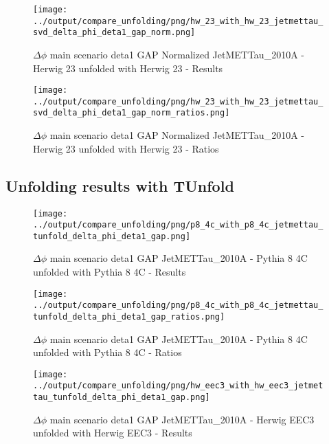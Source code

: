 \documentclass[11pt]{book}
\begin{document}
\begin{figure}[ht]
\centering
\texttt{[image: ../output/compare\_unfolding/png/hw\_23\_with\_hw\_23\_jetmettau\_svd\_delta\_phi\_deta1\_gap\_norm.png]}
\caption{$\Delta\phi$ main scenario deta1 GAP Normalized JetMETTau\_2010A - Herwig 23 unfolded with Herwig 23 - Results}
\label{hw_23_hw_23_jetmettau_svd_delta_phi_deta1_gap_norm_a}
\end{figure}

\begin{figure}[ht]
\centering
\texttt{[image: ../output/compare\_unfolding/png/hw\_23\_with\_hw\_23\_jetmettau\_svd\_delta\_phi\_deta1\_gap\_norm\_ratios.png]}
\caption{$\Delta\phi$ main scenario deta1 GAP Normalized JetMETTau\_2010A - Herwig 23 unfolded with Herwig 23 - Ratios}
\label{hw_23_hw_23_jetmettau_svd_delta_phi_deta1_gap_norm_b}
\end{figure}



\clearpage
\subsection{Unfolding results with TUnfold}

\begin{figure}[ht]
\centering
\texttt{[image: ../output/compare\_unfolding/png/p8\_4c\_with\_p8\_4c\_jetmettau\_tunfold\_delta\_phi\_deta1\_gap.png]}
\caption{$\Delta\phi$ main scenario deta1 GAP JetMETTau\_2010A - Pythia 8 4C unfolded with Pythia 8 4C - Results}
\label{p8_p8_jetmettau_tunfold_delta_phi_deta1_gap_a}
\end{figure}

\begin{figure}[ht]
\centering
\texttt{[image: ../output/compare\_unfolding/png/p8\_4c\_with\_p8\_4c\_jetmettau\_tunfold\_delta\_phi\_deta1\_gap\_ratios.png]}
\caption{$\Delta\phi$ main scenario deta1 GAP JetMETTau\_2010A - Pythia 8 4C unfolded with Pythia 8 4C - Ratios}
\label{p8_p8_jetmettau_tunfold_delta_phi_deta1_gap_b}
\end{figure}

\begin{figure}[ht]
\centering
\texttt{[image: ../output/compare\_unfolding/png/hw\_eec3\_with\_hw\_eec3\_jetmettau\_tunfold\_delta\_phi\_deta1\_gap.png]}
\caption{$\Delta\phi$ main scenario deta1 GAP JetMETTau\_2010A - Herwig EEC3 unfolded with Herwig EEC3 - Results}
\label{hw_eec3_hw_eec3_jetmettau_tunfold_delta_phi_deta1_gap_a}
\end{figure}
\end{document}
